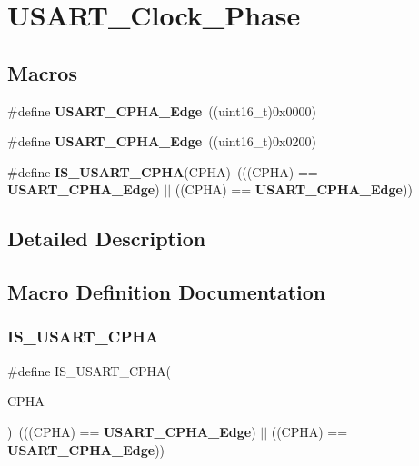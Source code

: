 \section{U\+S\+A\+R\+T\+\_\+\+Clock\+\_\+\+Phase}
\label{group__USART__Clock__Phase}
\subsection*{Macros}
\begin{DoxyCompactItemize}
\item 
\#define \textbf{ U\+S\+A\+R\+T\+\_\+\+C\+P\+H\+A\+\_\+Edge}~((uint16\+\_\+t)0x0000)
\item 
\#define \textbf{ U\+S\+A\+R\+T\+\_\+\+C\+P\+H\+A\+\_\+Edge}~((uint16\+\_\+t)0x0200)
\item 
\#define \textbf{ I\+S\+\_\+\+U\+S\+A\+R\+T\+\_\+\+C\+P\+HA}(C\+P\+HA)~(((C\+P\+HA) == \textbf{ U\+S\+A\+R\+T\+\_\+\+C\+P\+H\+A\+\_\+Edge}) $\vert$$\vert$ ((C\+P\+HA) == \textbf{ U\+S\+A\+R\+T\+\_\+\+C\+P\+H\+A\+\_\+Edge}))
\end{DoxyCompactItemize}


\subsection{Detailed Description}


\subsection{Macro Definition Documentation}
\mbox{\label{group__USART__Clock__Phase_ga66fa1a3a757025fcd8dd069a90689f88}} 
\subsubsection{I\+S\+\_\+\+U\+S\+A\+R\+T\+\_\+\+C\+P\+HA}
{\footnotesize\ttfamily \#define I\+S\+\_\+\+U\+S\+A\+R\+T\+\_\+\+C\+P\+HA(\begin{DoxyParamCaption}\item[{}]{C\+P\+HA }\end{DoxyParamCaption})~(((C\+P\+HA) == \textbf{ U\+S\+A\+R\+T\+\_\+\+C\+P\+H\+A\+\_\+Edge}) $\vert$$\vert$ ((C\+P\+HA) == \textbf{ U\+S\+A\+R\+T\+\_\+\+C\+P\+H\+A\+\_\+Edge}))}



